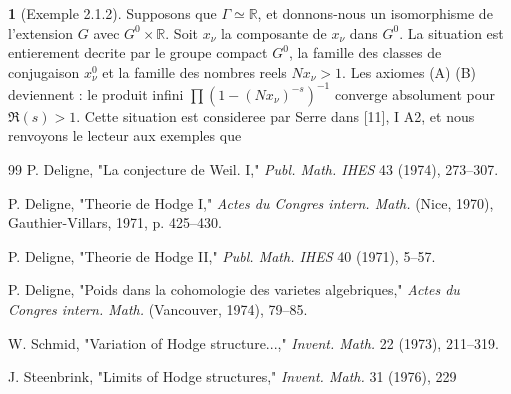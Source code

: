 \documentclass[12pt,a4paper]{article}
\theoremstyle{plain}
\theoremstyle{definition}
\theoremstyle{definition}
\newtheorem{para}{}[section]
\theoremstyle{remark}
\begin{document}
\begin{para}[Exemple 2.1.2]
Supposons que $\Gamma \simeq \mathbb{R}$, et donnons-nous un isomorphisme de l'extension $G$ avec $G^0 \times \mathbb{R}$. Soit $x_\nu$ la composante de $x_\nu$ dans $G^0$. La situation est entierement decrite par le groupe compact $G^0$, la famille des classes de conjugaison $x_\nu^0$ et la famille des nombres reels $Nx_\nu > 1$. Les axiomes (A) (B) deviennent : le produit infini $\prod(1 - (Nx_\nu)^{-s})^{-1}$ converge absolument pour $\Re(s) > 1$. Cette situation est consideree par Serre dans [11], I A2, et nous renvoyons le lecteur aux exemples que 
\end{para}


\newpage
\begin{thebibliography}{99}
P. Deligne, "La conjecture de Weil. I," \emph{Publ. Math. IHES} 43 (1974), 273--307.

P. Deligne, "Theorie de Hodge I," \emph{Actes du Congres intern. Math.} (Nice, 1970), Gauthier-Villars, 1971, p. 425--430.

P. Deligne, "Theorie de Hodge II," \emph{Publ. Math. IHES} 40 (1971), 5--57.

P. Deligne, "Poids dans la cohomologie des varietes algebriques," \emph{Actes du Congres intern. Math.} (Vancouver, 1974), 79--85.

W. Schmid, "Variation of Hodge structure...," \emph{Invent. Math.} 22 (1973), 211--319.

J. Steenbrink, "Limits of Hodge structures," \emph{Invent. Math.} 31 (1976), 229
\end{thebibliography}
\end{document}
